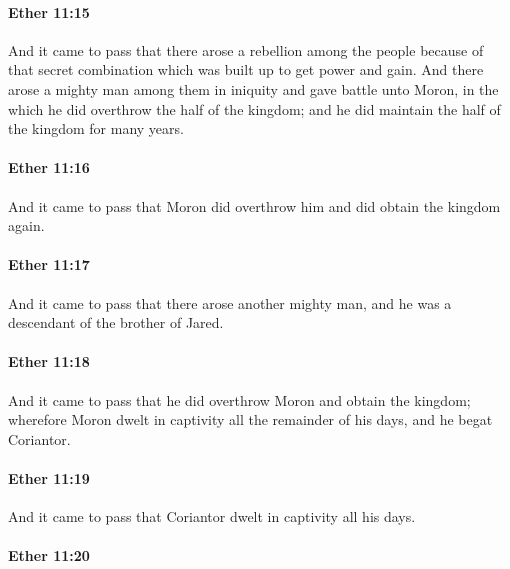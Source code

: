 		\paragraph{Ether 11:15} %
			\label{ETHER-11-15}

			And it came to pass that there arose a rebellion among the people
			because of that secret combination which was built up to get power and gain.
			And there arose a mighty man among them in iniquity
			and gave battle unto Moron,
			in the which he did overthrow the half of the kingdom;
			and he did maintain the half of the kingdom for many years.

		\paragraph{Ether 11:16} %
			\label{ETHER-11-16}

			And it came to pass that Moron did overthrow him
			and did obtain the kingdom again.

		\paragraph{Ether 11:17} %
			\label{ETHER-11-17}

			And it came to pass that there arose another mighty man,
			and he was a descendant of the brother of Jared.

		\paragraph{Ether 11:18} %
			\label{ETHER-11-18}

			And it came to pass that he did overthrow Moron and obtain the kingdom;
			wherefore Moron dwelt in captivity all the remainder of his days,
			and he begat Coriantor.

		\paragraph{Ether 11:19} %
			\label{ETHER-11-19}

			And it came to pass that Coriantor dwelt in captivity all his days.

		\paragraph{Ether 11:20} %
			\label{ETHER-11-20}

